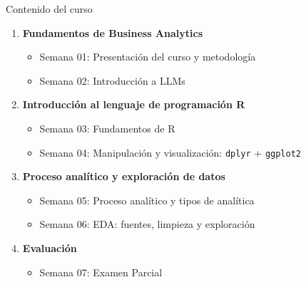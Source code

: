 \documentclass[10pt, xcolor=dvipsnames]{beamer}
\begin{document}
\begin{frame}{Contenido del curso}
\begin{enumerate}
  \item \textbf{Fundamentos de Business Analytics}
  \begin{itemize}
    \item Semana 01: Presentación del curso y metodología
    \item Semana 02: Introducción a LLMs
  \end{itemize} \vspace{0.15cm}

  \item \textbf{Introducción al lenguaje de programación R}
  \begin{itemize}
    \item Semana 03: Fundamentos de R
    \item Semana 04: Manipulación y visualización: \texttt{dplyr} + \texttt{ggplot2}
  \end{itemize} \vspace{0.15cm}

  \item \textbf{Proceso analítico y exploración de datos}
  \begin{itemize}
    \item Semana 05: Proceso analítico y tipos de analítica 
    \item Semana 06: EDA: fuentes, limpieza y exploración
  \end{itemize} \vspace{0.15cm}

  \item \textbf{Evaluación}
  \begin{itemize}
    \item Semana 07: Examen Parcial
  \end{itemize}
\end{enumerate}
\end{frame}
\end{document}
